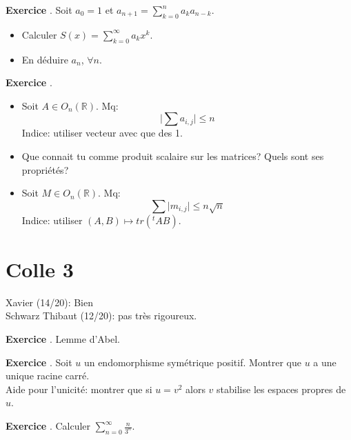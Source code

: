 \documentclass[10pt,a4paper]{article}
\newcounter{question}
\newcounter{exo}
\newenvironment{exo}{\vspace{0.5cm}\setcounter{question}{0}\addtocounter{exo}{1} \noindent \textbf{Exercice \theexo}. \normalsize }{\par}
\begin{document}
	\begin{exo}
		Soit $a_0 = 1$ et $a_{n+1} = \sum_{k=0}^{n} a_k a_{n-k}$.
		\begin{itemize}
			\item Calculer $S(x) = \sum_{k=0}^{\infty} a_k x^k$.
			\item En déduire $a_n$, $\forall n$.
		\end{itemize}
	\end{exo}
	
	\begin{exo}
		\begin{itemize}
			\item Soit $A \in O_n(\mathbb{R})$. Mq:
			$$\vert \sum a_{i,j} \vert \leq n$$ 
			Indice: utiliser vecteur avec que des 1.
			\item Que connait tu comme produit scalaire sur les matrices? Quels sont ses propriétés?
			\item Soit $M \in O_n(\mathbb{R})$. Mq:
			$$\sum \vert m_{i,j} \vert \leq n \sqrt{n}$$ 
			Indice: utiliser $(A, B) \longmapsto tr({}^t A B)$.
		\end{itemize}
	\end{exo}
	
	\section*{Colle 3}
	\setcounter{exo}{0}
	Xavier (14/20): Bien\\
	Schwarz Thibaut (12/20): pas très rigoureux. \\
	
	\begin{exo}
		Lemme d'Abel.
	\end{exo}
	
	\begin{exo}
		Soit $u$ un endomorphisme symétrique positif. Montrer que $u$ a une unique racine carré.\\
		Aide pour l'unicité: montrer que si $u = v^2$ alors $v$ stabilise les espaces propres de $u$.
	\end{exo}

	\begin{exo}
		Calculer $\sum_{n=0}^{\infty} \frac{n}{3^n}$.
	\end{exo}
\end{document}
